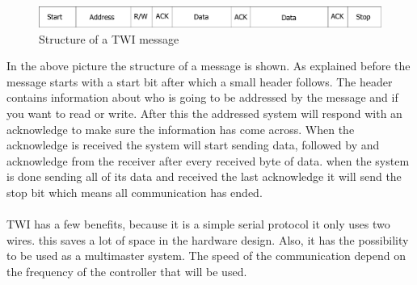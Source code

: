 \documentclass[10pt,a4paper]{article}
\begin{document}
\begin{figure}[H]
        \centering
        \graphicspath{ {./images/} }
        \includegraphics[scale=.3]{TWImessage.pdf}
        \caption{Structure of a TWI message}
        \label{fig:TWIstructure}
\end{figure}
In the above picture the structure of a message is shown. As explained before the message starts with a start bit after which a small header follows. The header contains information about who is going to be addressed by the message and if you want to read or write. After this the addressed system will respond with an acknowledge to make sure the information has come across. When the acknowledge is received the system will start sending data, followed by and acknowledge from the receiver after every received byte of data. when the system is done sending all of its data and received the last acknowledge it will send the stop bit which means all communication has ended.
\\
\\
TWI has a few benefits, because it is a simple serial protocol it only uses two wires. this saves a lot of space in the hardware design. Also, it has the possibility to be used as a multimaster system.
The speed of the communication depend on the frequency of the controller that will be used.
\end{document}
